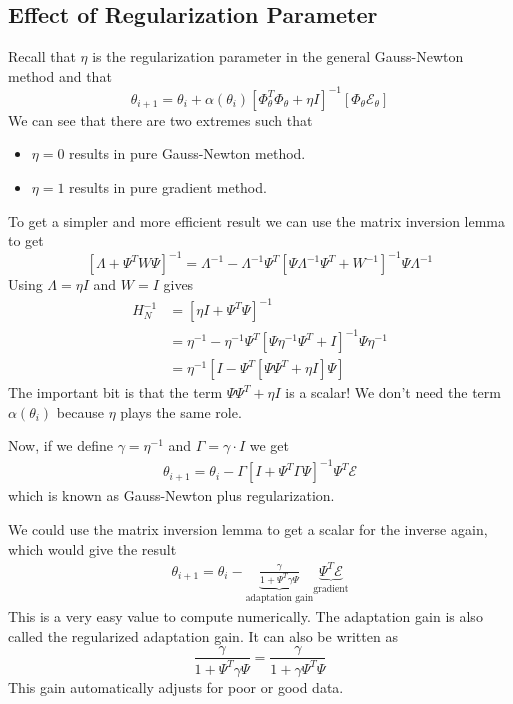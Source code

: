 \subsection{Effect of Regularization Parameter}
Recall that $\eta$ is the regularization parameter in the general Gauss-Newton method and that
$$\theta_{i+1} = \theta_i+\alpha(\theta_i){\left[\Phi_\theta^T\Phi_\theta + \eta I\right]}^{-1}\left[\Phi_\theta\mathcal{E}_\theta\right]$$
We can see that there are two extremes such that
\begin{itemize}
\item $\eta=0$ results in pure Gauss-Newton method.
\item $\eta=1$ results in pure gradient method.
\end{itemize}
To get a simpler and more efficient result we can use the matrix inversion lemma to get
$${\left[\Lambda+\Psi^T W\Psi\right]}^{-1} = \Lambda^{-1} - \Lambda^{-1}\Psi^T{\left[\Psi\Lambda^{-1}\Psi^T + W^{-1}\right]}^{-1}\Psi\Lambda^{-1}$$
Using $\Lambda=\eta I$ and $W=I$ gives
\begin{align*}
H_N^{-1} &= {\left[\eta I + \Psi^T\Psi\right]}^{-1} \\
&= \eta^{-1}-\eta^{-1}\Psi^T{\left[\Psi\eta^{-1}\Psi^T+I\right]}^{-1}\Psi\eta^{-1} \\
&= \eta^{-1}\left[I-\Psi^T\left[\Psi\Psi^T+\eta I\right]\Psi\right]
\end{align*}
The important bit is that the term $\Psi\Psi^T+\eta I$ is a scalar! We don't need the term $\alpha(\theta_i)$ because $\eta$ plays the same role.

Now, if we define $\gamma=\eta^{-1}$ and $\Gamma=\gamma\cdot I$ we get
\begin{align*}
\boxed{\theta_{i+1} = \theta_i - \Gamma{\left[I+\Psi^T\Gamma\Psi\right]}^{-1}\Psi^T\mathcal{E}}
\end{align*}
which is known as Gauss-Newton plus regularization.

We could use the matrix inversion lemma to get a scalar for the inverse again, which would give the result
\begin{align*}
\boxed{\theta_{i+1} = \theta_i - \underbrace{\frac{\gamma}{1+\Psi^T\gamma\Psi}}_{\text{adaptation gain}}\underbrace{\Psi^T\mathcal{E}}_{\text{gradient}}}
\end{align*}
This is a very easy value to compute numerically.
The adaptation gain is also called the regularized adaptation gain.
It can also be written as
$$\frac{\gamma}{1+\Psi^T\gamma\Psi} = \frac{\gamma}{1+\gamma\Psi^T\Psi}$$
This gain automatically adjusts for poor or good data.

